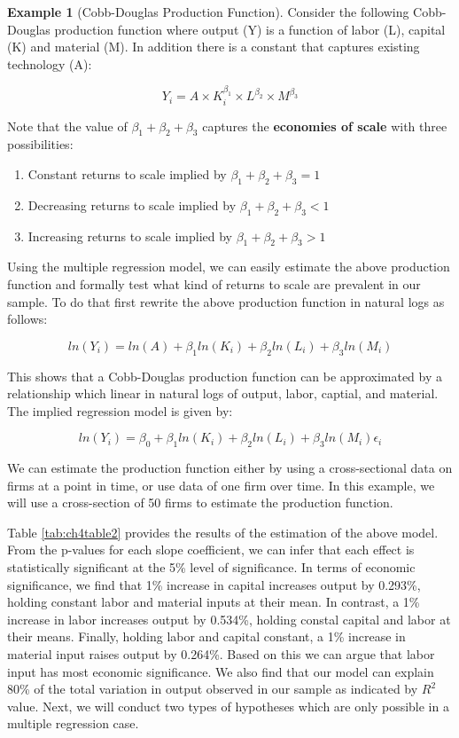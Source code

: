 \documentclass[
]{book}
\theoremstyle{definition}
\theoremstyle{definition}
\newtheorem{example}{Example}[chapter]
\theoremstyle{definition}
\theoremstyle{definition}
\theoremstyle{remark}
\begin{document}
\begin{example}[Cobb-Douglas Production Function]
\protect\hypertarget{exm:unnamed-chunk-21}{}\label{exm:unnamed-chunk-21}Consider the following Cobb-Douglas production function where output (Y) is a function of labor (L), capital (K) and material (M). In addition there is a constant that captures existing technology (A):

\[Y_i= A \times K_i^{\beta_1} \times  L^{\beta_2} \times M^{\beta_3}\]

Note that the value of \(\beta_1+\beta_2+\beta_3\) captures the \textbf{economies of scale} with three possibilities:

\begin{enumerate}
\def\labelenumi{\arabic{enumi}.}
\item
  Constant returns to scale implied by \(\beta_1+\beta_2+\beta_3=1\)
\item
  Decreasing returns to scale implied by \(\beta_1+\beta_2+\beta_3<1\)
\item
  Increasing returns to scale implied by \(\beta_1+\beta_2+\beta_3>1\)
\end{enumerate}

Using the multiple regression model, we can easily estimate the above production function and formally test what kind of returns to scale are prevalent in our sample. To do that first rewrite the above production function in natural logs as follows:

\[ln(Y_i) = ln(A) + \beta_1 ln (K_i) + \beta_2 ln (L_i)+\beta_3 ln (M_i)\]

This shows that a Cobb-Douglas production function can be approximated by a relationship which linear in natural logs of output, labor, captial, and material. The implied regression model is given by:

\[ln(Y_i) = \beta_0 + \beta_1 ln (K_i) + \beta_2 ln (L_i) +\beta_3 ln (M_i) \epsilon_i\]

We can estimate the production function either by using a cross-sectional data on firms at a point in time, or use data of one firm over time. In this example, we will use a cross-section of 50 firms to estimate the production function.

Table \ref{tab:ch4table2} provides the results of the estimation of the above model. From the p-values for each slope coefficient, we can infer that each effect is statistically significant at the 5\% level of significance. In terms of economic significance, we find that 1\% increase in capital increases output by 0.293\%, holding constant labor and material inputs at their mean. In contrast, a 1\% increase in labor increases output by 0.534\%, holding constal capital and labor at their means. Finally, holding labor and capital constant, a 1\% increase in material input raises output by 0.264\%. Based on this we can argue that labor input has most economic significance. We also find that our model can explain 80\% of the total variation in output observed in our sample as indicated by \(R^2\) value. Next, we will conduct two types of hypotheses which are only possible in a multiple regression case.
\end{example}
\end{document}
